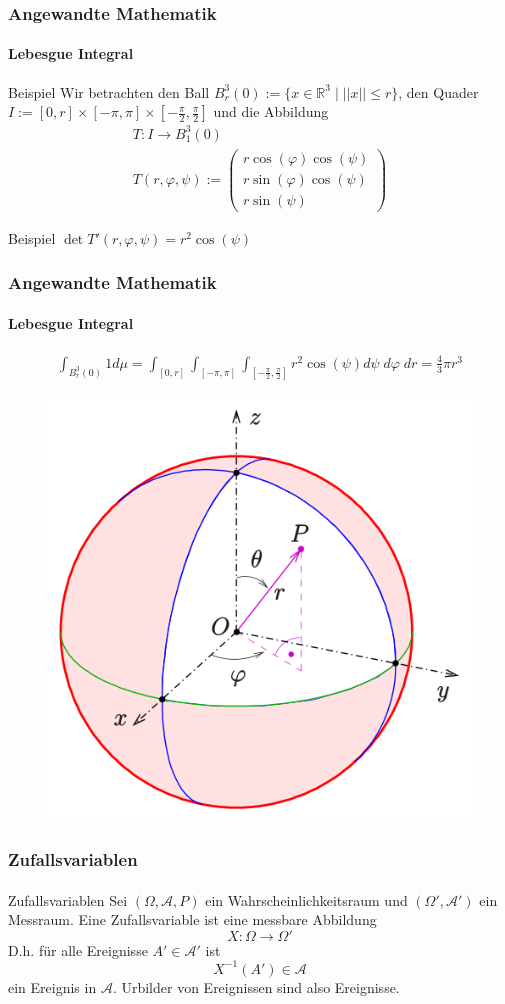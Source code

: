 \documentclass{beamer}
\begin{document}
\begin{frame}
    \frametitle{Angewandte Mathematik}
\framesubtitle{Lebesgue Integral}
\begin{block}{Beispiel}
Wir betrachten den Ball $B_r^3(0):= \{ x \in \mathbb{R}^3 \; | \; || x || \leq r  \}$, den Quader $I := [0,r] \times [- \pi, \pi] \times [- \frac{\pi}{2}, \frac{\pi}{2}]$ und die Abbildung
\begin{align*}
T : I \to B_1^3(0) \\
T(r, \varphi, \psi) := \begin{pmatrix} r \cos(\varphi) \cos(\psi)   \\  r \sin(\varphi) \cos(\psi) \\ r  \sin(\psi)     \end{pmatrix}
\end{align*}
\end{block}
\begin{block}{Beispiel}
$\det T'(r, \varphi, \psi) = r^2 \cos(\psi)$
\end{block}
 \end{frame}

\begin{frame}
    \frametitle{Angewandte Mathematik}
\framesubtitle{Lebesgue Integral}
\begin{align*}
\int_{B_r^3(0)} 1 d\mu = \int_{ [0,r] } \int_{ [- \pi, \pi]} \int_{[- \frac{\pi}{2}, \frac{\pi}{2}]} r^2 \cos(\psi) d \psi \; d \varphi \; dr = \frac{4} {3} \pi r^3
\end{align*}
\begin{figure}[H]
      \centering
    \includegraphics[width=0.4 \textwidth]{img/500px-Kugelkoord-def}    
\end{figure}
 \end{frame}



\begin{frame}
    \frametitle{Zufallsvariablen}
\framesubtitle{}

\begin{block}{Zufallsvariablen}
Sei $(\Omega, \mathcal{A}, P)$ ein Wahrscheinlichkeitsraum und $(\Omega', \mathcal{A}')$ ein Messraum. Eine Zufallsvariable ist eine messbare Abbildung 
$$X : \Omega \to \Omega'$$ 
D.h. für alle Ereignisse $A' \in  \mathcal{A}'$ ist 
$$ X^{-1} (A') \in \mathcal{A}$$
 ein Ereignis in $\mathcal{A}$. Urbilder von Ereignissen sind also Ereignisse.
\end{block}

 \end{frame}
\end{document}
